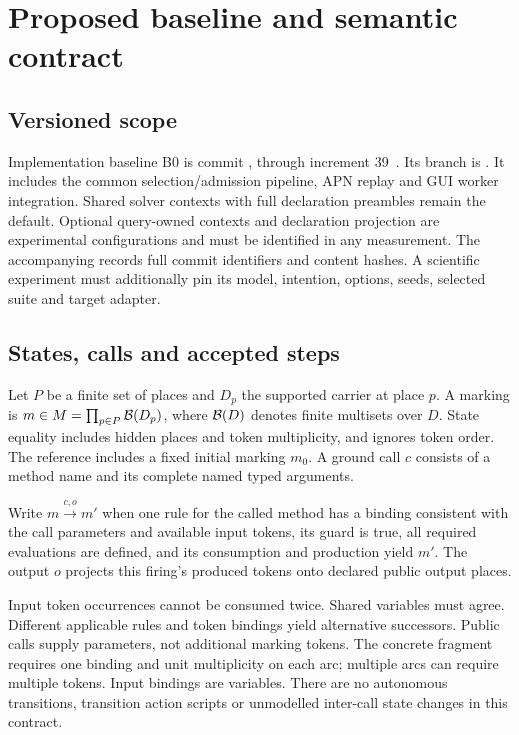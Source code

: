 \section{Proposed baseline and semantic contract}\label{sec:contract}
\subsection{Versioned scope}
Implementation baseline B0 is commit \baseline{}, through increment 39~\cite{implementation}.
Its branch is . It includes the common
selection/admission pipeline, APN replay and GUI worker integration. Shared solver
contexts with full declaration preambles remain the default. Optional query-owned
contexts and declaration projection are experimental configurations and must be
identified in any measurement. The accompanying  records full
commit identifiers and content hashes. A scientific experiment must additionally
pin its model, intention, options, seeds, selected suite and target adapter.

\subsection{States, calls and accepted steps}
Let $P$ be a finite set of places and $D_p$ the supported carrier at place $p$.
A marking is $m\in M=\prod_{p\in P}\mathcal{B}(D_p)$, where $\mathcal{B}(D)$ denotes finite
multisets over $D$. State equality includes hidden places and token multiplicity,
and ignores token order. The reference includes a fixed initial marking $m_0$.
A ground call $c$ consists of a method name and its complete named typed arguments.

\begin{definition}
Write $m\xrightarrow{c,o}m'$ when one rule for the called method has a binding
consistent with the call parameters and available input tokens, its guard is true,
all required evaluations are defined, and its consumption and production yield
$m'$. The output $o$ projects this firing's produced tokens onto declared public
output places.
\end{definition}
Input token occurrences cannot be consumed twice. Shared variables must agree.
Different applicable rules and token bindings yield alternative successors. Public
calls supply parameters, not additional marking tokens. The concrete fragment
requires one binding and unit multiplicity on each arc; multiple arcs can require
multiple tokens. Input bindings are variables. There are no autonomous transitions,
transition action scripts or unmodelled inter-call state changes in this contract.

